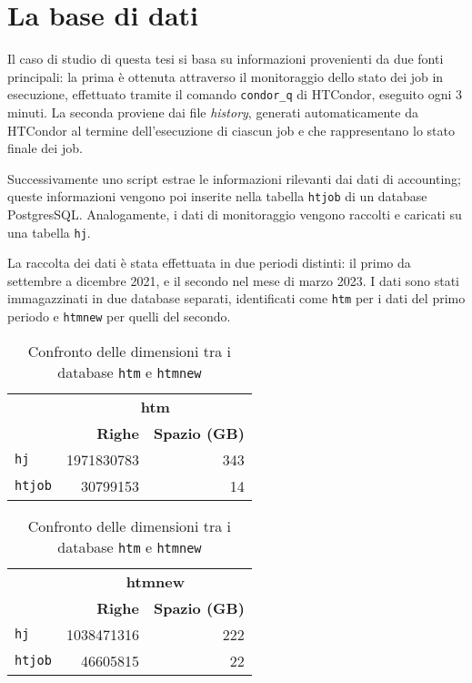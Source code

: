 \section{La base di dati}

Il caso di studio di questa tesi si basa su informazioni provenienti da due
fonti principali: la prima è ottenuta attraverso il monitoraggio dello stato
dei job in esecuzione, effettuato tramite il comando \texttt{condor\_q} di
HTCondor, eseguito ogni 3 minuti. La seconda proviene dai file
\textit{history}, generati automaticamente da HTCondor al termine
dell'esecuzione di ciascun job e che rappresentano lo stato finale dei job.

Successivamente uno script estrae le informazioni rilevanti dai dati di
accounting; queste informazioni vengono poi inserite nella tabella
\texttt{htjob} di un database PostgresSQL. Analogamente, i dati di
monitoraggio vengono raccolti e caricati su una tabella \texttt{hj}.

La raccolta dei dati è stata effettuata in due periodi distinti: il primo da
settembre a dicembre 2021, e il secondo nel mese di marzo 2023. I dati sono
stati immagazzinati in due database separati, identificati come \texttt{htm}
per i dati del primo periodo e \texttt{htmnew} per quelli del secondo.

\begin{table}[!htbp]
    \centering 
    \begin{tabular}{
      lrr
    }
        \toprule 
        & \multicolumn{2}{c}{\textbf{htm}} \\
        \cmidrule{2-3}
        & {\textbf{Righe}} & {\textbf{Spazio (GB)}} \\ 
        \midrule
        \texttt{hj}      & 1971830783 & 343 \\
        \texttt{htjob}   & 30799153 & 14 \\
        \bottomrule
    \end{tabular}
    \hspace*{1cm}
    \begin{tabular}{lrr}
        \toprule
        & \multicolumn{2}{c}{\textbf{htmnew}} \\
        \cmidrule{2-3}
        & {\textbf{Righe}} & {\textbf{Spazio (GB)}} \\
        \midrule
        \texttt{hj}      & 1038471316 & 222 \\
        \texttt{htjob}   & 46605815 & 22 \\
        \bottomrule
    \end{tabular}
    \caption{Confronto delle dimensioni tra i database \texttt{htm} e \texttt{htmnew}}
    \label{table:database_comparison}
\end{table}

